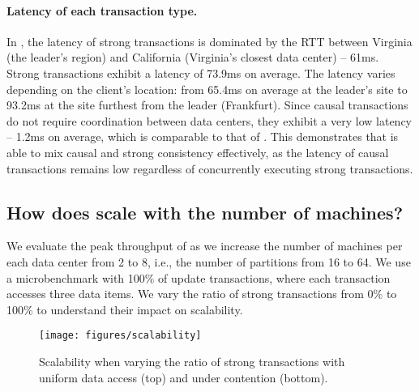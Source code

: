 \paragraph{Latency of each transaction type.}
In \System, the latency of strong transactions is dominated by
the RTT between Virginia (the leader's
region) and California (Virginia's closest data center) -- 61ms. Strong transactions
exhibit a latency of 73.9ms on average. The latency varies depending on
the client's location: from 65.4ms on average at the leader's site to 93.2ms at the
site furthest from the leader (Frankfurt). Since causal transactions do not
require coordination between data centers, they
exhibit a very low latency -- 1.2ms on average, which is comparable to
that of \Causal. This
demonstrates that \System is able to mix causal and strong
consistency effectively, as the latency of causal transactions remains
low regardless of concurrently executing strong transactions.




\subsection{How does \System scale with the number of machines?}
\label{sec:scalability}

We evaluate the
peak throughput of \System as we increase
the number of machines per each data center from 2 to
8, i.e., the number of partitions from 16 to 64. We
use a microbenchmark with 100\% of update transactions, 
where each transaction accesses three data items. We vary the ratio of
strong transactions from 0\% to 100\%
to understand their impact on scalability. 



\begin{figure}[t]
\texttt{[image: figures/scalability]}
\caption{Scalability when varying the ratio of strong transactions
  with uniform data access (top) and under contention (bottom).}
\label{fig:scalability}
\end{figure}


